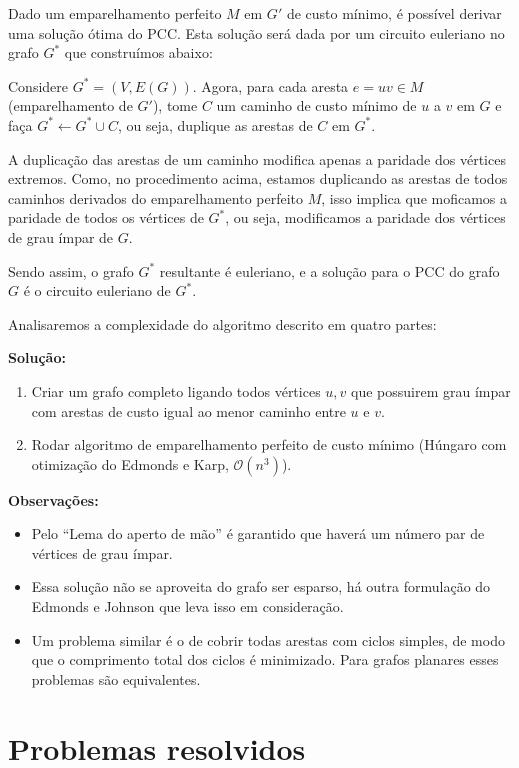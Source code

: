 \documentclass{article}
\begin{document}
Dado um emparelhamento perfeito $M$ em $G'$ de custo mínimo, é possível derivar uma solução ótima do PCC. Esta solução será dada por um circuito euleriano no grafo $G^*$ que construímos abaixo:

Considere $G^* = (V, E(G))$. Agora, para cada aresta $e = uv \in M$ (emparelhamento de $G'$), tome $C$ um caminho de custo mínimo de $u$ a $v$ em $G$ e faça $G^* \leftarrow G^* \cup C$, ou seja, duplique as arestas de $C$ em $G^*$.

A duplicação das arestas de um caminho modifica apenas a paridade dos vértices extremos.
Como, no procedimento acima, estamos duplicando as arestas de todos caminhos derivados do emparelhamento perfeito $M$, isso implica que moficamos a paridade de todos os vértices de $G^*$, ou seja, modificamos a paridade dos vértices de grau ímpar de $G$.

Sendo assim, o grafo $G^*$ resultante é euleriano, e a solução para o PCC do grafo $G$ é o circuito euleriano de $G^*$.


Analisaremos a complexidade do algoritmo descrito em quatro partes:


\textbf{Solução:} 
\begin{enumerate} %
    \item Criar um grafo completo ligando todos vértices $u, v$ que possuirem grau ímpar com arestas de custo igual ao menor caminho entre $u$ e $v$. 
    \item Rodar algoritmo de emparelhamento perfeito de custo mínimo (Húngaro com otimização do Edmonds e Karp, $\mathcal{O}(n^3)$).
\end{enumerate}


\textbf{Observações:}
    \begin{itemize}
		\item Pelo ``Lema do aperto de mão'' é garantido que haverá um número par de vértices de grau ímpar.
		\item Essa solução não se aproveita do grafo ser esparso, há outra formulação do Edmonds e Johnson que leva isso em consideração.
		\item Um problema similar é o de cobrir todas arestas com ciclos simples, de modo que o comprimento total dos ciclos é minimizado. Para grafos planares esses problemas são equivalentes.
	\end{itemize}

    \section{Problemas resolvidos}
\end{document}
